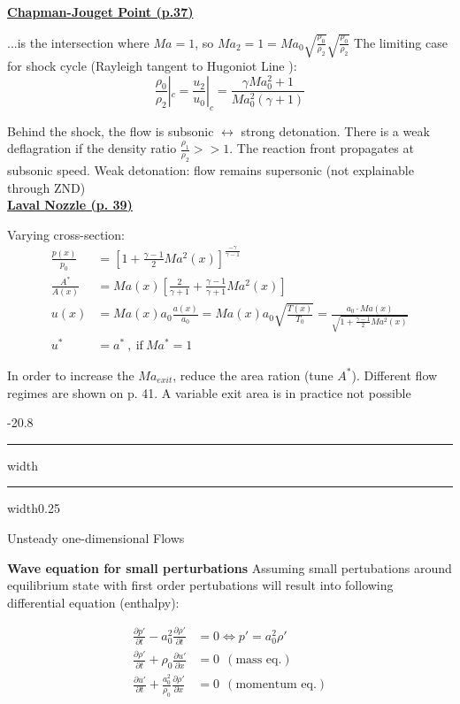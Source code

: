 \documentclass[8pt, landscape, fleqn]{scrartcl}
\makeatletter
\renewcommand{\section}{\@startsection{section}{1}{0mm}%
{-2\baselineskip}{0.8\baselineskip}%
{\hrule depth 0.2pt width\columnwidth\hrule depth1.5pt
width0.25\columnwidth\vspace*{1.2em}\Large\bfseries\rmfamily}}
\makeatother
\begin{document}
\begin{multicols*}{3}
\underline{\textbf{Chapman-Jouget Point (p.37)}}

...is the intersection where $Ma=1$, so $Ma_2 = 1 = Ma_0 \sqrt{\frac{\rho_0}{\rho_2}} \sqrt{\frac{\rho_0}{\rho_2}}$
The limiting case for shock cycle (Rayleigh tangent to Hugoniot Line ): 
\begin{equation*}
    \frac{\rho_0}{\rho_2} |_c = \frac{u_2}{u_0} |_c = \frac{ \gamma Ma_0^2 + 1 }{Ma_0^2 (\gamma + 1)}
\end{equation*}

Behind the shock, the flow is subsonic $\leftrightarrow$ strong detonation. There is a weak deflagration if the density ratio $\frac{\rho_1}{\rho_2} >> 1$. The reaction front propagates at subsonic speed.  Weak detonation: flow remains supersonic (not explainable through ZND)\\

\underline{\textbf{Laval Nozzle (p. 39)}}

Varying cross-section:
\begin{align*}
    \frac{p(x)}{p_0} &= \left[ 1 + \frac{\gamma - 1}{2} Ma^2 (x) \right]^{\frac{-\gamma}{\gamma-1}} \\
    \frac{A^*}{A(x)} &= Ma(x) \left[ \frac{2}{\gamma+1} + \frac{\gamma-1}{\gamma+1}Ma^2(x)\right] \\
    u(x) &= Ma(x) a_0 \frac{a(x)}{a_0} = Ma(x) a_0 \sqrt{\frac{T(x)}{T_0}} = \frac{a_0 \cdot Ma(x)}{\sqrt{1 + \frac{\gamma-1}{2}Ma^2(x)}} \\
    u^* &= a^* ~,~ \text{if}~ Ma^* = 1
\end{align*}

In order to increase the $Ma_{exit}$, reduce the area ration (tune $A^*$). Different flow regimes are shown on p. 41. A variable exit area is in practice not possible

\section{Unsteady one-dimensional Flows}

\textbf{Wave equation for small perturbations}
Assuming small pertubations around equilibrium state with first order pertubations will result into following differential equation (enthalpy):

\begin{align*}
    \frac{\partial p'}{\partial t} - a_0^2 \frac{\partial \rho'}{\partial t} &= 0 \Longleftrightarrow p' = a_0^2 \rho' \\
    \frac{\partial \rho'}{\partial t} + \rho_0 \frac{\partial u'}{\partial x} &= 0 ~~ (\text{mass eq.}) \\
    \frac{\partial u'}{\partial t} + \frac{a_0^2}{\rho_0} \frac{\partial \rho'}{\partial x} &= 0 ~~ (\text{momentum eq.})
\end{align*}


\end{multicols*}
\end{document}
